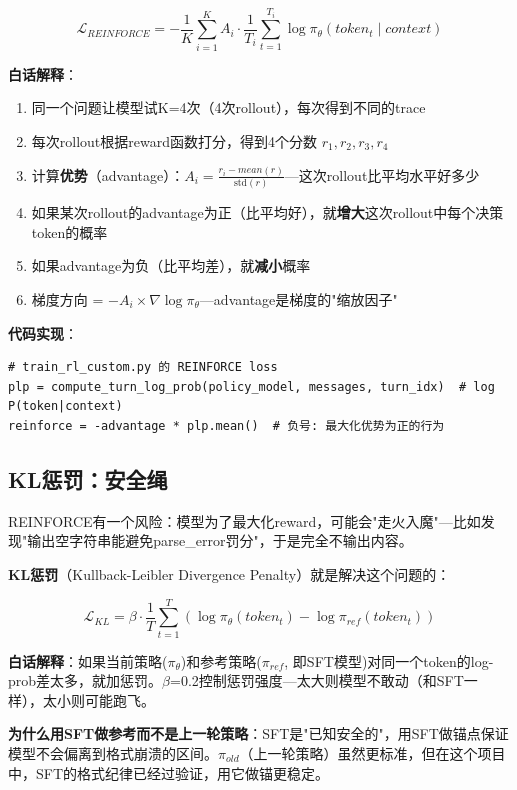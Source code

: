 \documentclass[fontset=none,11pt,a4paper]{ctexart}
\begin{document}
\[
\mathcal{L}_{REINFORCE} = -\frac{1}{K}\sum_{i=1}^{K} A_i \cdot \frac{1}{T_i}\sum_{t=1}^{T_i} \log\pi_\theta(token_t \mid context)
\]

\textbf{白话解释}：
\begin{enumerate}[nosep]
    \item 同一个问题让模型试K=4次（4次rollout），每次得到不同的trace
    \item 每次rollout根据reward函数打分，得到4个分数 $r_1, r_2, r_3, r_4$
    \item 计算\textbf{优势}（advantage）：$A_i = \frac{r_i - mean(r)}{\text{std}(r)}$---这次rollout比平均水平好多少
    \item 如果某次rollout的advantage为正（比平均好），就\textbf{增大}这次rollout中每个决策token的概率
    \item 如果advantage为负（比平均差），就\textbf{减小}概率
    \item 梯度方向 = $-A_i \times \nabla\log\pi_\theta$---advantage是梯度的"缩放因子"
\end{enumerate}

\textbf{代码实现}：
\begin{lstlisting}
# train_rl_custom.py 的 REINFORCE loss
plp = compute_turn_log_prob(policy_model, messages, turn_idx)  # log P(token|context)
reinforce = -advantage * plp.mean()  # 负号: 最大化优势为正的行为
\end{lstlisting}

\subsection{KL惩罚：安全绳}

REINFORCE有一个风险：模型为了最大化reward，可能会"走火入魔"---比如发现"输出空字符串能避免parse\_error罚分"，于是完全不输出内容。

\textbf{KL惩罚}（Kullback-Leibler Divergence Penalty）就是解决这个问题的：

\[
\mathcal{L}_{KL} = \beta \cdot \frac{1}{T}\sum_{t=1}^{T} (\log\pi_\theta(token_t) - \log\pi_{ref}(token_t))
\]

\textbf{白话解释}：如果当前策略($\pi_\theta$)和参考策略($\pi_{ref}$, 即SFT模型)对同一个token的log-prob差太多，就加惩罚。$\beta$=0.2控制惩罚强度---太大则模型不敢动（和SFT一样），太小则可能跑飞。

\textbf{为什么用SFT做参考而不是上一轮策略}：SFT是"已知安全的"，用SFT做锚点保证模型不会偏离到格式崩溃的区间。$\pi_{old}$（上一轮策略）虽然更标准，但在这个项目中，SFT的格式纪律已经过验证，用它做锚更稳定。
\end{document}
